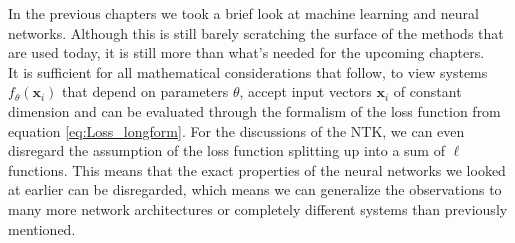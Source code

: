 In the previous chapters we took a brief look at machine learning and neural networks. Although this is still barely scratching the surface of the methods that are used today, it is still more than what's needed for the upcoming chapters.\\
It is sufficient for all mathematical considerations that follow, to view systems $f_\theta(\mathbf{x}_i)$ that depend on parameters $\theta$, accept input vectors $\mathbf{x}_i$ of constant dimension and can be evaluated through the formalism of the loss function from equation \cref{eq:Loss_longform}. For the discussions of the NTK, we can even disregard the assumption of the loss function splitting up into a sum of $\ell$ functions. This means that the exact properties of the neural networks we looked at earlier can be disregarded, which means we can generalize the observations to many more network architectures or completely different systems than previously mentioned.
